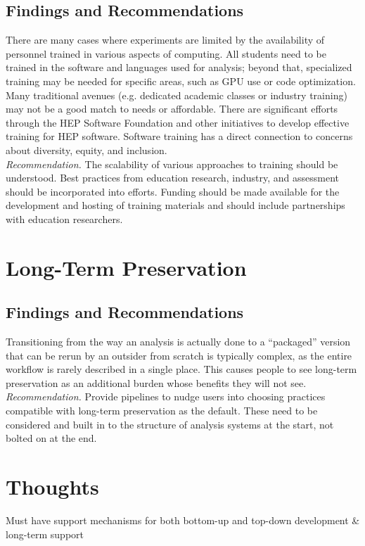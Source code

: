 \subsection{Findings and Recommendations}
There are many cases where experiments are limited by the availability of personnel trained in various aspects of computing. All students need to be trained in the software and languages used for analysis; beyond that, specialized training may be needed for specific areas, such as GPU use or code optimization. Many traditional avenues (e.g. dedicated academic classes or industry training) may not be a good match to needs or affordable. There are significant efforts through the HEP Software Foundation and other initiatives to develop effective training for HEP software. Software training has a direct connection to concerns about diversity, equity, and inclusion.\\
\textit{Recommendation.} The scalability of various approaches to training should be understood. Best practices from education research, industry, and assessment should be incorporated into efforts. Funding should be made available for the development and hosting of training materials and should include partnerships with education researchers.

\section{Long-Term Preservation}
\subsection{Findings and Recommendations}
Transitioning from the way an analysis is actually done to a “packaged” version that can be rerun by an outsider from scratch is typically complex, as the entire workflow is rarely described in a single place. This causes people to see long-term preservation as an additional burden whose benefits they will not see.\\
\textit{Recommendation.} Provide pipelines to nudge users into choosing practices compatible with long-term preservation as the default. These need to be considered and built in to the structure of analysis systems at the start, not bolted on at the end.

\section{Thoughts}
Must have support mechanisms for both bottom-up and top-down development \& long-term support


